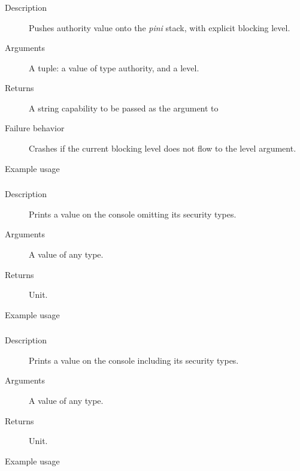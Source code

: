\subsubsection{}
\begin{description}
    \item [Description] Pushes authority value onto the \emph{pini} stack,
   with explicit blocking level.
    \item [Arguments] A tuple: a value of type authority, and a level.
    \item [Returns] A string capability to be passed as the argument to 
    \item [Failure behavior] Crashes if the current blocking level does not flow to the level argument.
    \item [Example usage] 
\end{description}


\subsubsection{}
\begin{description}
    \item [Description] Prints a value on the console omitting its security types.
    \item [Arguments] A value of any type.
    \item [Returns] Unit.
    \item [Example usage] 
\end{description}


\subsubsection{}
\begin{description}
    \item [Description] Prints a value on the console including its security types.
    \item [Arguments] A value of any type.
    \item [Returns] Unit.
    \item [Example usage] 
\end{description}



